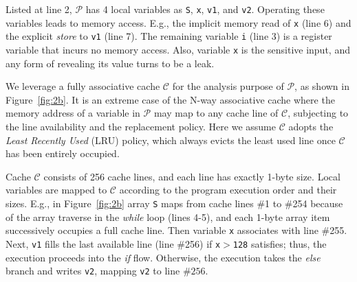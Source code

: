 \documentclass[sigconf]{acmart}
\newcommand{\prog}{\mathcal{P}}
\begin{document}
Listed at line 2, ${\prog}$ has 4 local variables as \texttt{S}, \texttt{x}, 
\texttt{v1}, and \texttt{v2}. Operating these variables leads to memory 
access. E.g., the implicit memory read of \texttt{x} (line 6) and the 
explicit \emph{store} to \texttt{v1} (line 7). The remaining variable 
\texttt{i} (line 3) is a register variable that incurs no memory access. 
Also, variable \texttt{x} is the sensitive input, and any form of revealing 
its value turns to be a leak. 


We leverage a fully associative cache $\mathcal{C}$ for the analysis purpose 
of $\prog$, as shown in Figure~\ref{fig:2b}. It is an extreme case of the 
N-way associative cache where the memory address of a variable in $\prog$ may 
map to any cache line of $\mathcal{C}$, subjecting to the line availability 
and the replacement policy. Here we assume $\mathcal{C}$ adopts the \emph{Least
Recently Used} (LRU) policy, which always evicts the least used line once 
$\mathcal{C}$ has been entirely occupied.


Cache $\mathcal{C}$ consists of 256 cache lines, and each line has exactly 
1-byte size. Local variables are mapped to $\mathcal{C}$ according to the 
program execution order and their sizes. E.g., in Figure~\ref{fig:2b} array 
\texttt{S} maps from cache lines \#1 to \#254 because of the array traverse 
in the \emph{while} loop (lines 4-5), and each 1-byte array item successively 
occupies a full cache line. Then variable \texttt{x} associates with line 
\#255. Next, \texttt{v1} fills the last available line (line \#256) if 
\texttt{x}$>$\texttt{128} satisfies; thus, the execution proceeds into the 
\textit{if} flow. Otherwise, the execution takes the \textit{else} branch 
and writes \texttt{v2}, mapping \texttt{v2} to line $\#256$.
\end{document}
